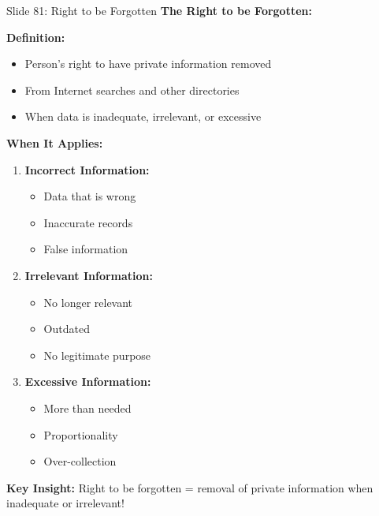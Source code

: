 \documentclass[8pt]{beamer}
\begin{document}
	\begin{frame}{Slide 81: Right to be Forgotten}
		\fontsize{6.5}{7.5}\selectfont
		\textbf{The Right to be Forgotten:}
		
		\vspace{0.1cm}
		\textbf{Definition:}
		\begin{itemize}
			\item Person's right to have private information removed
			\item From Internet searches and other directories
			\item When data is inadequate, irrelevant, or excessive
		\end{itemize}
		
		\vspace{0.1cm}
		\textbf{When It Applies:}
		\begin{enumerate}
			\item \textbf{Incorrect Information:}
			\begin{itemize}
				\item Data that is wrong
				\item Inaccurate records
				\item False information
			\end{itemize}
			\item \textbf{Irrelevant Information:}
			\begin{itemize}
				\item No longer relevant
				\item Outdated
				\item No legitimate purpose
			\end{itemize}
			\item \textbf{Excessive Information:}
			\begin{itemize}
				\item More than needed
				\item Proportionality
				\item Over-collection
			\end{itemize}
		\end{enumerate}
		
		\textcolor{myblue}{\textbf{Key Insight:}} Right to be forgotten = \textcolor{myblue}{removal of private information when inadequate or irrelevant}!
	\end{frame}
	
\end{document}
